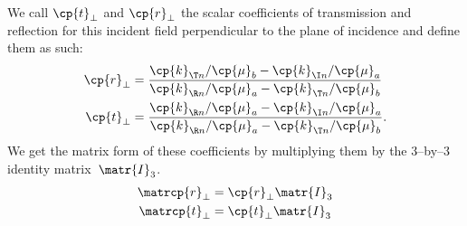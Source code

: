 \begin{refsection}
We call $\cp{t}_\perp$ and $\cp{r}_\perp$ the scalar coefficients of transmission and reflection for this incident field perpendicular to the plane of incidence and define them as such:
\begin{align}
    \cp{r}_\perp 
    &=
    \frac{
        \cp{k}_{\T n} / \cp{\mu}_b - \cp{k}_{\I n} / \cp{\mu}_a
    }{
        \cp{k}_{\R n} / \cp{\mu}_a - \cp{k}_{\T n} / \cp{\mu}_b
    }
    \label{eq:complex_fresnel_rs}
    \\
    \cp{t}_\perp 
    &=
    \frac{
        \cp{k}_{\R n} / \cp{\mu}_a - \cp{k}_{\I n} / \cp{\mu}_a
    }{
        \cp{k}_{\R n} / \cp{\mu}_a - \cp{k}_{\T n} / \cp{\mu}_b
    }
    \text{.}
    \label{eq:complex_fresnel_ts}
\end{align}
We get the matrix form of these coefficients by multiplying them by the 3--by--3 identity matrix~$\matr{I}_3$.
\begin{align}
    \matrcp{r}_\perp &= \cp{r}_\perp \matr{I}_3
    \\
    \matrcp{t}_\perp &= \cp{t}_\perp \matr{I}_3
\end{align}



\end{refsection}
